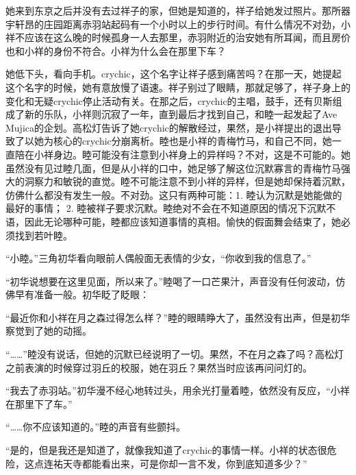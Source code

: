 \documentclass{article}
\begin{document}
她来到东京之后并没有去过祥子的家，但她是知道的，祥子给她发过照片。那所器宇轩昂的庄园距离赤羽站起码有一个小时以上的步行时间。有什么情况不对劲，小祥不应该在这么晚的时候孤身一人去那里，赤羽附近的治安她有所耳闻，而且房价也和小祥的身份不符合。小祥为什么会在那里下车？



她低下头，看向手机。crychic，这个名字让祥子感到痛苦吗？在那一天，她提起这个名字的时候，她有意放慢了语速。祥子别过了眼睛，那就足够了，祥子身上的变化和无疑crychic停止活动有关。在那之后，crychic的主唱，鼓手，还有贝斯组成了新的乐队，小祥则沉寂了一年，直到最后才找到自己，和睦一起发起了Ave Mujica的企划。高松灯告诉了她crychic的解散经过，果然，是小祥提出的退出导致了以她为核心的crychic分崩离析。睦也是小祥的青梅竹马，和自己不同，她一直陪在小祥身边。睦可能没有注意到小祥身上的异样吗？不对，这是不可能的。她虽然没有见过睦几面，但是从小祥的口中，她足够了解这位沉默寡言的青梅竹马强大的洞察力和敏锐的直觉。睦不可能注意不到小祥的异样，但是她却保持着沉默，仿佛什么都没有发生一般。不对劲。这只有两种可能：1. 睦认为沉默是她能做的最好的事情； 2. 睦被祥子要求沉默。睦绝对不会在不知道原因的情况下沉默不语，因此无论哪种可能，睦都应该知道事情的真相。愉快的假面舞会结束了，她必须找到若叶睦。



\newpage



“小睦。”三角初华看向眼前人偶般面无表情的少女，“你收到我的信息了。”



“初华说想要在这里见面，所以来了。”睦喝了一口芒果汁，声音没有任何波动，仿佛早有准备一般。初华眨了眨眼：



“最近你和小祥在月之森过得怎么样？”睦的眼睛睁大了，虽然没有出声，但是初华察觉到了她的动摇。



“……”睦没有说话，但她的沉默已经说明了一切。果然，不在月之森了吗？高松灯之前表演的时候穿过羽丘的校服，她在羽丘？果然当时应该再问问灯的。



“我去了赤羽站。”初华漫不经心地转过头，用余光打量着睦，依然没有反应，“小祥在那里下了车。”



“……你不应该知道的。”睦的声音有些颤抖。



“是的，但是我还是知道了，就像我知道了crychic的事情一样。小祥的状态很危险，这点连祐天寺都能看出来，可是你却一言不发，你到底知道多少？”
\end{document}
